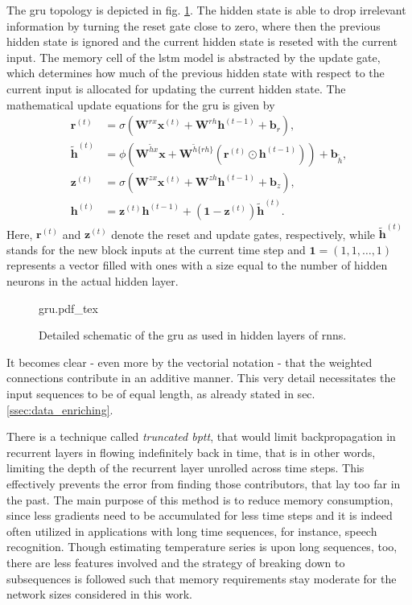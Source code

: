 The \gls{gru} topology is depicted in fig. \ref{fig:gru}.
The hidden state is able to drop irrelevant information by turning the reset gate close to zero, where then the previous hidden state is ignored and the current hidden state is reseted with the current input.
The memory cell of the \gls{lstm} model is abstracted by the update gate, which determines how much of the previous hidden state with respect to the current input is allocated for updating the current hidden state.
The mathematical update equations for the \gls{gru} is given by
\begin{align}
	\bm r^{(t)} &= \sigma\left(\bm W^{rx}\bm x^{(t)} + \bm W^{rh}\bm h^{(t-1)} + \bm b_r\right),\\
	\bm{\tilde h}^{(t)} &= \phi\left(\bm W^{\tilde hx}\bm x + \bm W^{\tilde h\{rh\}}(\bm r^{(t)}\odot\bm h^{(t-1)})\right) + \bm b_{\tilde h},\\
	\bm z^{(t)} &= \sigma\left(\bm W^{zx}\bm x^{(t)} + \bm W^{zh}\bm h^{(t-1)} + \bm b_z\right),\\
	\bm h^{(t)} &= \bm z^{(t)}\bm h^{(t-1)} + (\bm 1 - \bm z^{(t)})\bm{\tilde h}^{(t)}.
\end{align}
Here, $\bm r^{(t)}$ and $\bm z^{(t)}$ denote the reset and update gates, respectively, while $\bm{\tilde h}^{(t)}$ stands for the new block inputs at the current time step and $\bm 1 = (1, 1,\dots, 1)$ represents a vector filled with ones with a size equal to the number of hidden neurons in the actual hidden layer. 
\begin{figure}
	\footnotesize\centering
	\def\svgwidth{\columnwidth}
	{gru.pdf_tex}
         \caption{Detailed schematic of the \gls{gru} as used in hidden layers of \glspl{rnn}.}
	\label{fig:gru}
\end{figure}

It becomes clear - even more by the vectorial notation - that the weighted connections contribute in an additive manner.
This very detail necessitates the input sequences to be of equal length, as already stated in sec. \ref{ssec:data_enriching}.

There is a technique called \textit{truncated \gls{bptt}}, that would limit backpropagation in recurrent layers in flowing indefinitely back in time, that is in other words, limiting the depth of the recurrent layer unrolled across time steps.
This effectively prevents the error from finding those contributors, that lay too far in the past.
The main purpose of this method is to reduce memory consumption, since less gradients need to be accumulated for less time steps and it is indeed often utilized in applications with long time sequences, for instance, speech recognition.
Though estimating temperature series is upon long sequences, too, there are less features involved and the strategy of breaking down to subsequences is followed such that memory requirements stay moderate for the network sizes considered in this work.

